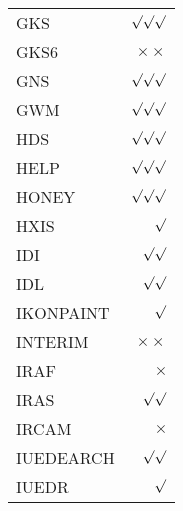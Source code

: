 \begin{center}
\begin{tabular}{||l|r||}
GKS       & $\surd\surd\surd$ \\
GKS6      & $\times\times$ \\
GNS       & $\surd\surd\surd$ \\
GWM       & $\surd\surd\surd$ \\
HDS       & $\surd\surd\surd$ \\
HELP      & $\surd\surd\surd$ \\
HONEY     & $\surd\surd\surd$ \\
HXIS      & $\surd$ \\
IDI       & $\surd\surd$ \\
IDL       & $\surd\surd$ \\
IKONPAINT & $\surd$ \\
INTERIM   & $\times\times$ \\
IRAF      & $\times$ \\
IRAS      & $\surd\surd$ \\
IRCAM     & $\times$ \\
IUEDEARCH & $\surd\surd$ \\
IUEDR     & $\surd$ \\
\hline
\end{tabular}
\end{center}

\newpage

